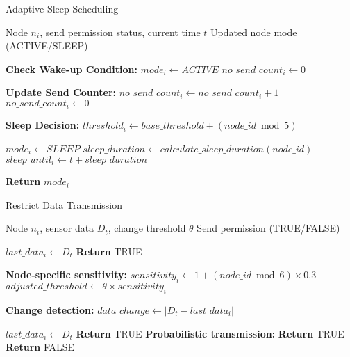 \documentclass{article}
\begin{document}
\begin{algorithm}[H]
\caption{Adaptive Sleep Scheduling}
\label{alg:sleep_scheduling}
\begin{algorithmic}[1]

\REQUIRE Node $n_i$, send permission status, current time $t$
\ENSURE Updated node mode (ACTIVE/SLEEP)

\STATE \textbf{Check Wake-up Condition:}
    \STATE $mode_i \leftarrow ACTIVE$
    \STATE $no\_send\_count_i \leftarrow 0$
\ENDIF

\STATE \textbf{Update Send Counter:}
    \STATE $no\_send\_count_i \leftarrow no\_send\_count_i + 1$
\ELSE
    \STATE $no\_send\_count_i \leftarrow 0$
\ENDIF

\STATE \textbf{Sleep Decision:}
\STATE $threshold_i \leftarrow base\_threshold + (node\_id \bmod 5)$

    \STATE $mode_i \leftarrow SLEEP$
    \STATE $sleep\_duration \leftarrow calculate\_sleep\_duration(node\_id)$
    \STATE $sleep\_until_i \leftarrow t + sleep\_duration$
\ENDIF

\STATE \textbf{Return} $mode_i$

\end{algorithmic}
\end{algorithm}

\begin{algorithm}[H]
\caption{Restrict Data Transmission}
\label{alg:data_transmission}
\begin{algorithmic}[1]

\REQUIRE Node $n_i$, sensor data $D_t$, change threshold $\theta$
\ENSURE Send permission (TRUE/FALSE)

 
    \STATE $last\_data_i \leftarrow D_t$
    \STATE \textbf{Return} TRUE
\ENDIF

\STATE \textbf{Node-specific sensitivity:}
\STATE $sensitivity_i \leftarrow 1 + (node\_id \bmod 6) \times 0.3$
\STATE $adjusted\_threshold \leftarrow \theta \times sensitivity_i$

\STATE \textbf{Change detection:}
\STATE $data\_change \leftarrow |D_t - last\_data_i|$

    \STATE $last\_data_i \leftarrow D_t$
    \STATE \textbf{Return} TRUE
\ELSE
    \STATE \textbf{Probabilistic transmission:} 
        \STATE \textbf{Return} TRUE
    \ENDIF
    \STATE \textbf{Return} FALSE
\ENDIF

\end{algorithmic}
\end{algorithm}
\end{document}
